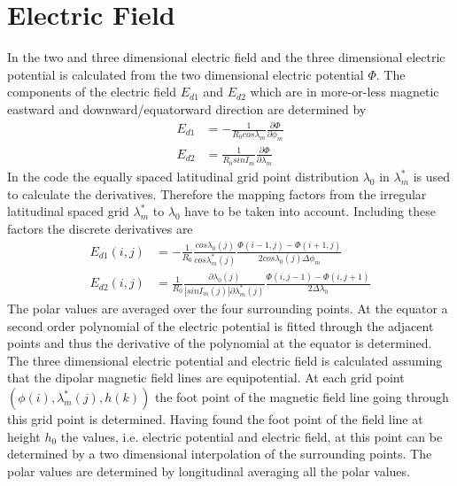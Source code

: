 %
\section{Electric Field}
%
In  the two and three dimensional 
electric field and the three dimensional electric potential 
is calculated from the two dimensional electric
potential $\Phi$. The components of the electric field $E_{d1}$ and $E_{d2}$
which are in more-or-less magnetic eastward and downward/equatorward direction are
determined by
%
\begin{align}
   E_{d1} &= - \frac{1}{R_0 cos \lambda_m}\frac{\partial \Phi}{\partial \phi_m} \\
   E_{d2} &= \frac{1}{R_0 sin I_m}\frac{\partial \Phi}{\partial \lambda_m}
\end{align}
%
In the code the equally spaced latitudinal grid point
distribution $\lambda_0$ in $\lambda_m^*$ is used to calculate the derivatives. Therefore 
the mapping factors from the irregular latitudinal spaced 
grid $\lambda_m^*$ to $\lambda_0$ have to be taken into account. 
Including these factors the discrete derivatives are
%
\begin{align}
   E_{d1}(i,j) &= - \frac{1}{R_0}\frac{cos \lambda_0(j)}{cos \lambda_m^*(j)}
           \frac{ \Phi(i-1,j) -\Phi(i+1,j) }{2 cos \lambda_0(j) \Delta \phi_m} \\
   E_{d2}(i,j) &= \frac{1}{R_0}\frac{\partial \lambda_0(j)}{|sin I_m(j)|
               \partial \lambda_m^*(j)}
            \frac{\Phi(i,j-1) -\Phi(i,j+1)}{2 \Delta \lambda_0}
\end{align}
%
The polar values are averaged over the four surrounding points. At the equator a
second order polynomial of the electric potential is fitted through the adjacent points
and thus the derivative of the polynomial at the equator is determined. \\

The three dimensional electric potential and electric field is calculated
assuming that the dipolar magnetic field lines are equipotential. At each grid 
point $(\phi(i),\lambda_m^*(j),h(k))$
the foot point of the magnetic field line going through this grid point is
determined. Having found the foot point of the field line at height $h_0$
the values, i.e. electric potential and electric field, 
at this point can be determined by a two dimensional interpolation of
the surrounding points. The polar values are determined by longitudinal 
averaging all the polar values.
